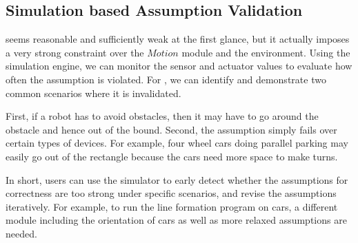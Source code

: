 \subsection{Simulation based Assumption Validation}

 seems reasonable and sufficiently weak at the first glance,
but it actually imposes a very strong constraint over the $Motion$ module and the environment.
Using the simulation engine, we can monitor the sensor and actuator values to evaluate how often the assumption is violated.
For , we can identify and demonstrate two common scenarios
where it is invalidated.


First, if a robot has to avoid obstacles,
then it may have to go around the obstacle and hence out of the bound.
Second, the assumption simply fails over certain types of devices.
For example, four wheel cars doing parallel parking may easily go out of the rectangle
because the cars need more space to make turns.

In short, users can use the simulator to early detect whether
the assumptions for correctness are too strong under specific scenarios,
and revise the assumptions iteratively.
For example, to run the line formation program on cars,
a different module including the orientation of cars as well as more relaxed assumptions are needed.
